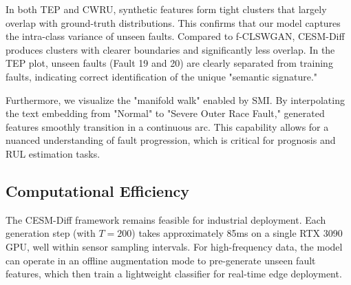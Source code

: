 In both TEP and CWRU, synthetic features form tight clusters that largely overlap with ground-truth distributions. This confirms that our model captures the intra-class variance of unseen faults. Compared to f-CLSWGAN, CESM-Diff produces clusters with clearer boundaries and significantly less overlap. In the TEP plot, unseen faults (Fault 19 and 20) are clearly separated from training faults, indicating correct identification of the unique "semantic signature."

Furthermore, we visualize the "manifold walk" enabled by SMI. By interpolating the text embedding from "Normal" to "Severe Outer Race Fault," generated features smoothly transition in a continuous arc. This capability allows for a nuanced understanding of fault progression, which is critical for prognosis and RUL estimation tasks.

\subsection{Computational Efficiency}
The CESM-Diff framework remains feasible for industrial deployment. Each generation step (with $T=200$) takes approximately 85ms on a single RTX 3090 GPU, well within sensor sampling intervals. For high-frequency data, the model can operate in an offline augmentation mode to pre-generate unseen fault features, which then train a lightweight classifier for real-time edge deployment.
